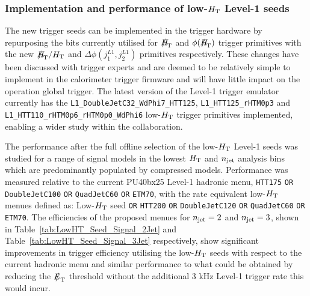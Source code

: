 \subsubsection{Implementation and performance of low-$\mbox{$H_\text{T}$}$ Level-1 seeds}

The new trigger seeds can be implemented in the trigger hardware by repurposing the bits currently utilised for $\mht$ and $\phi({\mht})$ trigger primitives with the new $\mht/\scalht$ and $\Delta\phi(j_{1}^{L1},j_{2}^{L1})$ primitives respectively. These changes have been discussed with trigger experts and are deemed to be relatively simple to implement in the calorimeter trigger firmware and will have little impact on the operation global trigger. The latest version of the Level-1 trigger emulator currently has the \verb!L1_DoubleJetC32_WdPhi7_HTT125!, \verb!L1_HTT125_rHTM0p3! and \\ \verb!L1_HTT110_rHTM0p6_rHTM0p0_WdPhi6! low-$\mbox{$H_\text{T}$}$ trigger primitives implemented, enabling a wider study within the collaboration.

The performance after the full offline selection of the low-$\mbox{$H_\text{T}$}$ Level-1 seeds was studied for a range of signal models in the lowest $\mbox{$H_\text{T}$}$ and $n_{\text{jet}}$ analysis bins which are predominantly populated by compressed models. Performance was measured relative to the current PU40bx25 Level-1 hadronic menu, {\verb!HTT175! \verb!OR! \verb!DoubleJetC100! \verb!OR! \verb!QuadJetC60! \verb!OR! \verb!ETM70!}, with the rate equivalent low-$\mbox{$H_\text{T}$}$ menues defined as: Low-$\mbox{$H_\text{T}$}$ seed {\verb!OR! \verb!HTT200! \verb!OR! \verb!DoubleJetC120! \verb!OR! \verb!QuadJetC60! \verb!OR! \verb!ETM70!}. The efficiencies of the proposed menues for $n_{\text{jet}} = 2$ and $n_{\text{jet}} = 3$, shown in Table~\ref{tab:LowHT_Seed_Signal_2Jet} and Table~\ref{tab:LowHT_Seed_Signal_3Jet} respectively, show significant improvements in trigger efficiency utilising the low-$\mbox{$H_\text{T}$}$ seeds with respect to the current hadronic menu and similar performance to what could be obtained by reducing the $\met$ threshold without the additional 3 kHz Level-1 trigger rate this would incur.



